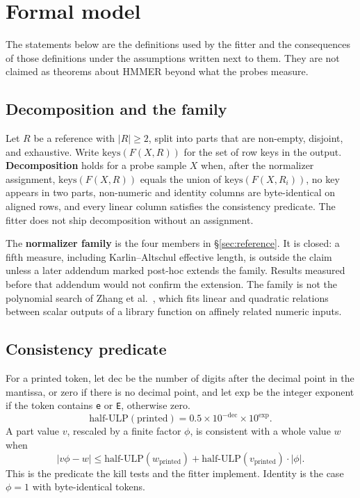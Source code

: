 \documentclass[letterpaper,twocolumn,10pt]{article}
\begin{document}
\section{Formal model}
\label{sec:formal}

The statements below are the definitions used by the fitter and the consequences of those definitions under the assumptions written next to them.
They are not claimed as theorems about HMMER beyond what the probes measure.

\subsection{Decomposition and the family}

Let $R$ be a reference with $|R| \ge 2$, split into parts that are non-empty, disjoint, and exhaustive.
Write $\mathrm{keys}(F(X, R))$ for the set of row keys in the output.
\textbf{Decomposition} holds for a probe sample $X$ when, after the normalizer assignment,
$\mathrm{keys}(F(X, R))$ equals the union of $\mathrm{keys}(F(X, R_i))$, no key appears in two parts, non-numeric and identity columns are byte-identical on aligned rows, and every linear column satisfies the consistency predicate.
The fitter does not ship decomposition without an assignment.

The \textbf{normalizer family} is the four members in \S\ref{sec:reference}.
It is closed: a fifth measure, including Karlin--Altschul effective length, is outside the claim unless a later addendum marked post-hoc extends the family.
Results measured before that addendum would not confirm the extension.
The family is not the polynomial search of Zhang et al.~\cite{zhang2014mri}, which fits linear and quadratic relations between scalar outputs of a library function on affinely related numeric inputs.

\subsection{Consistency predicate}

For a printed token, let $\mathrm{dec}$ be the number of digits after the decimal point in the mantissa, or zero if there is no decimal point, and let $\mathrm{exp}$ be the integer exponent if the token contains \texttt{e} or \texttt{E}, otherwise zero.
\[
\mathrm{half\text{-}ULP}(\mathrm{printed})
  = 0.5 \times 10^{-\mathrm{dec}} \times 10^{\mathrm{exp}}.
\]
A part value $v$, rescaled by a finite factor $\phi$, is consistent with a whole value $w$ when
\begin{equation}
|v \phi - w|
  \le \mathrm{half\text{-}ULP}(w_{\mathrm{printed}})
    + \mathrm{half\text{-}ULP}(v_{\mathrm{printed}}) \cdot |\phi|.
\label{eq:consistent}
\end{equation}
This is the predicate the kill tests and the fitter implement.
Identity is the case $\phi = 1$ with byte-identical tokens.
\end{document}
